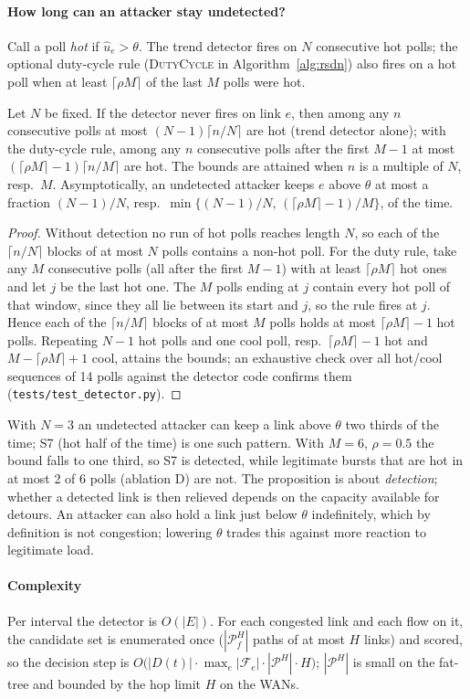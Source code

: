 \paragraph{How long can an attacker stay undetected?}
Call a poll \emph{hot} if $\hat u_e>\theta$. The trend detector fires on $N$ consecutive hot polls; the
optional duty-cycle rule (\textsc{DutyCycle} in Algorithm~\ref{alg:rsdn}) also fires on a hot poll when
at least $\lceil\rho M\rceil$ of the last $M$ polls were hot.
\begin{proposition}\label{prop:evasion}
Let $N$ be fixed. If the detector never fires on link $e$, then among any $n$ consecutive polls at most
$(N-1)\lceil n/N\rceil$ are hot (trend detector alone); with the duty-cycle rule, among any $n$
consecutive polls after the first $M-1$ at most $(\lceil\rho M\rceil-1)\lceil n/M\rceil$ are hot. The
bounds are attained when $n$ is a multiple of $N$, resp.\ $M$. Asymptotically, an undetected attacker keeps $e$ above $\theta$ at most a fraction
$(N-1)/N$, resp.\ $\min\{(N-1)/N,\,(\lceil\rho M\rceil-1)/M\}$, of the time.
\end{proposition}
\begin{proof}
Without detection no run of hot polls reaches length $N$, so each of the $\lceil n/N\rceil$ blocks of at
most $N$ polls contains a non-hot poll. For the duty rule, take any $M$ consecutive polls (all after
the first $M-1$) with at least $\lceil\rho M\rceil$ hot ones and let $j$ be the last hot one. The $M$
polls ending at $j$ contain every hot poll of that window, since they all lie between its start and
$j$, so the rule fires at $j$. Hence each of the $\lceil n/M\rceil$ blocks of at most $M$ polls holds at
most $\lceil\rho M\rceil-1$ hot polls. Repeating $N-1$ hot polls and one cool poll, resp.\
$\lceil\rho M\rceil-1$ hot and $M-\lceil\rho M\rceil+1$ cool, attains the bounds; an exhaustive check over
all hot/cool sequences of 14 polls against the detector code confirms them
(\texttt{tests/test\_detector.py}).
\end{proof}
With $N=3$ an undetected attacker can keep a link above $\theta$ two thirds of the time; S7 (hot half of
the time) is one such pattern. With $M=6$, $\rho=0.5$ the bound falls to one third, so S7 is detected,
while legitimate bursts that are hot in at most 2 of 6 polls (ablation D) are not. The proposition is
about \emph{detection}; whether a detected link is then relieved depends on the capacity available for
detours. An attacker can also hold a link just below $\theta$ indefinitely, which by definition is not
congestion; lowering $\theta$ trades this against more reaction to legitimate load.

\paragraph{Complexity}
Per interval the detector is $O(|E|)$. For each congested link and each flow on it, the candidate
set is enumerated once ($|\mathcal{P}_f^H|$ paths of at most $H$ links) and scored, so the
decision step is $O\big(|D(t)|\cdot\max_e|\mathcal{F}_e|\cdot|\mathcal{P}^H|\cdot H\big)$;
$|\mathcal{P}^H|$ is small on the fat-tree and bounded by the hop limit $H$ on the WANs.
